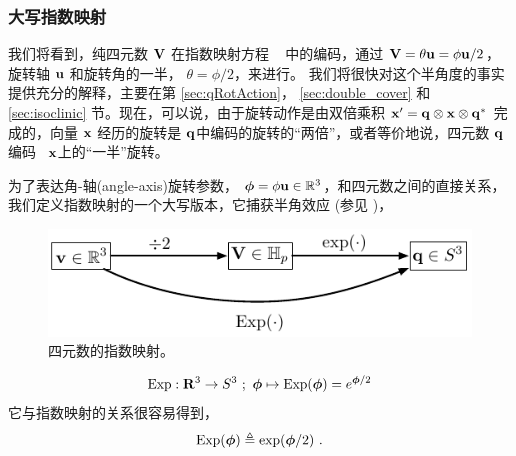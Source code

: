 \subsubsection{大写指数映射}

我们将看到，纯四元数 ${\bf V}$ 在指数映射方程 ~ 中的编码，通过 ${\bf V}=\theta{\bf u} = \phi{\bf u}/2$，旋转轴 ${\bf u}$ 和旋转角的一半， $\theta=\phi/2$，来进行。
我们将很快对这个半角度的事实提供充分的解释，主要在第 \ref{sec:qRotAction}， \ref{sec:double_cover} 和 \ref{sec:isoclinic} 节。现在，可以说，由于旋转动作是由双倍乘积 ${\bf x}'={\bf q}\otimes{\bf x}\otimes{\bf q}^*$ 完成的，向量 ${\bf x}$ 经历的旋转是 ${\bf q}$中编码的旋转的“两倍”，或者等价地说，四元数 ${\bf q}$ 编码 ~${\bf x}$上的“一半”旋转。

为了表达角-轴(angle-axis)旋转参数， ${\bm \phi}=\phi{\bf u}\in{\mathbb R}^3$，和四元数之间的直接关系，我们定义指数映射的一个大写版本，它捕获半角效应 (参见 )，
%
\begin{figure}[tb]
\begin{center}
\includegraphics{figures/exp_map_q}
\caption{四元数的指数映射。}
\label{fig:exp_map_q}
\end{center}
\end{figure}
%
\begin{align}
\operatorname*{Exp}:{\bf R}^3\to S^3~;~{\bm \phi}\mapsto\operatorname*{Exp}({\bm \phi})=e^{{\bm \phi}/2}
\end{align}
%
它与指数映射的关系很容易得到，
%
\begin{align}
\operatorname*{Exp}({\bm \phi}) \triangleq \exp({\bm \phi}/2)
~.
\end{align}


